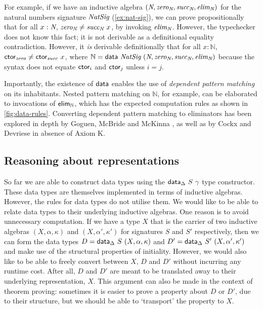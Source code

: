 For example, if we have an inductive algebra $(\textit{N}, \textit{zero}_{\textit{N}},
\textit{succ}_{\textit{N}}, \textit{elim}_{\textit{N}})$ for the natural numbers signature
$\textit{NatSig}$ (\cref{ex:nat-sig}), we can prove propositionally that for all $x : \textit{N}$,
$\textit{zero}_{\textit{N}} \neq \textit{succ}_{\textit{N}}\ x$, by invoking $\textit{elim}_{\textit{N}}$.
However, the typechecker does not know this fact; it is not derivable as a
definitional equality contradiction. However, it \emph{is} derivable
definitionally that for all $x : \mathbb{N}$, $\textsf{ctor}_{\textit{zero}} \neq
\textsf{ctor}_{\textit{succ}}\ x$, where $\mathbb{N} = \textsf{data}\ {\textit{NatSig}}\ (\textit{N},
\textit{zero}_{\textit{N}}, \textit{succ}_{\textit{N}}, \textit{elim}_{\textit{N}})$ because the
syntax does not equate $\textsf{ctor}_i$ and
$\textsf{ctor}_j$ unless $i = j$.

Importantly, the existence of $\textsf{data}$ enables the use of
\emph{dependent pattern matching} on its inhabitants. Nested pattern matching on
$\mathbb{N}$, for example, can be elaborated to invocations of
$\textsf{elim}_{\mathbb{N}}$, which has the expected computation rules as shown in
\cref{fig:data-rules}. Converting dependent pattern matching to eliminators has
been explored in depth by Goguen, McBride and McKinna \cite{Goguen2006-sy}, as
well as by Cockx and Devriese \cite{Cockx2018-bv} in absence of Axiom K.

\subsection{Reasoning about representations} \label{sub:lambdadata}

So far we are able to construct data types using the $\textsf{data}_\Delta\ S\ \gamma$
type constructor. These data types are themselves implemented in terms of
inductive algebras. However, the rules for data types do not utilise them. We
would like to be able to relate data types to their underlying inductive
algebras. One reason is to avoid unnecessary
computation. If we have a type $X$ that is the carrier of two inductive algebras
$(X, \alpha, \kappa)$ and $(X, \alpha', \kappa')$ for signatures $S$ and
$S'$ respectively, then we can form the data types $D = \textsf{data}_\Delta\ S\ (X,
\alpha, \kappa)$ and $D' = \textsf{data}_\Delta\ {S'}\ (X, \alpha', \kappa')$ and make
use of the structural properties of initiality. However, we would also like to
be able to freely convert between $X$, $D$ and $D'$ without incurring any
runtime cost. After all, $D$ and $D'$ are meant to be translated away to their
underlying representation, $X$. This argument can also be made in the context of
theorem proving: sometimes it is easier to prove a property about $D$ or $D'$,
due to their structure, but we should be able to `transport' the property to
$X$.


